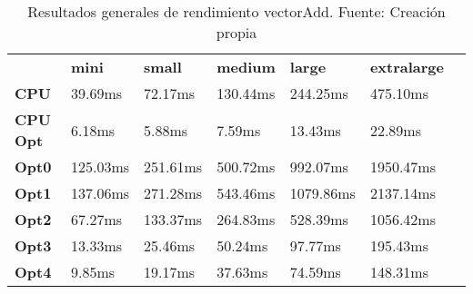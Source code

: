 \begin{table}[H]
    \centering
    \begin{tabular}{lllllll}
    \rowcolor[HTML]{DAE8FC} \ &  \textbf{mini} &  \textbf{small} &  \textbf{medium} &  \textbf{	large} &  \textbf{	extralarge} \\
    \cellcolor[HTML]{DAE8FC} \textbf{CPU} & 39.69ms & 72.17ms & 130.44ms & 	244.25ms & 	475.10ms \\
    \rowcolor[HTML]{EFEFEF} \cellcolor[HTML]{DAE8FC} \textbf{CPU Opt} & 6.18ms & 5.88ms & 7.59ms & 	13.43ms & 	22.89ms \\
    \cellcolor[HTML]{DAE8FC} \textbf{Opt0} & 125.03ms & 251.61ms & 500.72ms & 	992.07ms & 	1950.47ms \\
    \rowcolor[HTML]{EFEFEF} \cellcolor[HTML]{DAE8FC} \textbf{Opt1} & 137.06ms & 271.28ms & 543.46ms & 	1079.86ms & 	2137.14ms \\
    \cellcolor[HTML]{DAE8FC} \textbf{Opt2} & 67.27ms & 133.37ms & 264.83ms & 	528.39ms & 	1056.42ms \\
    \rowcolor[HTML]{EFEFEF} \cellcolor[HTML]{DAE8FC} \textbf{Opt3} & 13.33ms & 25.46ms & 50.24ms & 	97.77ms & 	195.43ms \\
    \cellcolor[HTML]{DAE8FC} \textbf{Opt4} & 9.85ms & 19.17ms & 37.63ms & 	74.59ms & 	148.31ms \\
    \end{tabular}
    \caption[Resultados generales de rendimiento vectorAdd]{{Resultados generales de rendimiento vectorAdd. Fuente: Creación propia}}
    \label{table_global_vectorAdd_PerformanceResults_data}
\end{table}